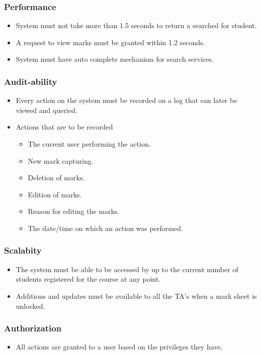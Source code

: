 \documentclass[11pt,a4paper]{article}
\begin{document}
\subsubsection{Performance}
	\begin{itemize}
	\item System must not take more than 1.5 seconds to return a searched for student.
	\item A request to view marks must be granted within 1.2 seconds.
	\item System must have auto complete mechanism for search services.
	\end{itemize}

	\subsubsection{Audit-ability}
	\begin{itemize}
	\item Every action on the system must be recorded on a log that can later be viewed and queried.
	\item Actions that are to be recorded
	\begin{itemize}
	\item The current user performing the action.
	\item New mark capturing.
	\item Deletion of marks.
	\item Edition of marks.
	\item Reason for editing the marks.
	\item The date/time on which an action was performed.
	\end{itemize}
	\end{itemize}

\subsubsection{Scalabity}
	\begin{itemize}
	\item The system must be able to be accessed by up to the current number of students registered for the course at any point.
	\item Additions and updates must be available to all the TA's when a mark sheet is unlocked.
	\end{itemize}	

	\subsubsection{Authorization}
	\begin{itemize}
	\item All actions are granted to a user based on the privileges they have.
	\end{itemize}
\end{document}
